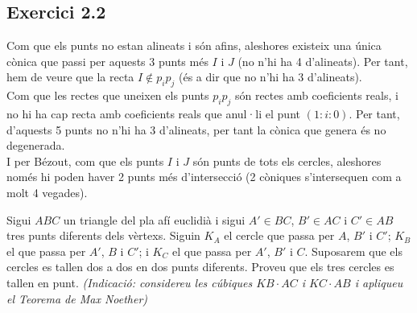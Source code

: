 \documentclass[11pt, a4paper]{article}
\begin{document}

\subsection{Exercici 2.2}
Com que els punts no estan alineats i són afins, aleshores existeix una única cònica que passi per aquests 3 punts més $I$ i $J$ (no n'hi ha 4 d'alineats). Per tant, hem de veure que la recta $I\notin p_ip_j$ (és a dir que no n'hi ha 3 d'alineats).\\
Com que les rectes que uneixen els punts $p_ip_j$ són rectes amb coeficients reals, i no hi ha cap recta amb coeficients reals que anul·li el punt $(1:i:0)$. Per tant, d'aquests 5 punts no n'hi ha 3 d'alineats, per tant la cònica que genera és no degenerada.\\
I per Bézout, com que els punts $I$ i $J$ són punts de tots els cercles, aleshores només hi poden haver 2 punts més d'intersecció (2 còniques s'intersequen com a molt 4 vegades).
\newpage
\begin{tcolorbox}[title=\section{Exercici 3: (Teorema d'August Miquel)}]
Sigui $ABC$ un triangle del pla afí euclidià i sigui $A'\in BC$, $B'\in AC$ i $C'\in AB$ tres punts diferents dels vèrtexs. Siguin $K_A$ el cercle que passa per $A$, $B'$ i $C'$; $K_B$ el que passa per $A'$, $B$ i $C'$; i $K_C$ el que passa per $A'$, $B'$ i $C$. Suposarem que els cercles es tallen dos a dos en dos punts diferents. Proveu
que els tres cercles es tallen en punt. \textit{(Indicació: considereu les cúbiques $KB \cdot AC$ i $KC \cdot AB$ i apliqueu el Teorema de Max Noether)}
\end{tcolorbox}
\end{document}
